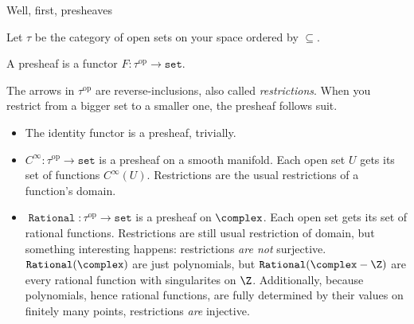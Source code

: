 \documentclass[a5paper]{scrartcl}
\def\setcat{\texttt{set}}
\newcommand{\op}{\textrm{op}}
\newcommand{\marginnote}[1]{\normalmarginpar\marginpar{\tiny\sffamily\raggedright #1}}
\DeclareMathOperator{\rat}{\texttt{Rational}}
\begin{document}
Well, first, presheaves
\begin{defn}\marginnote{\ie, draw one arrow \(A\to B\) iff \(A\subseteq B\).}
  Let \(\tau\) be the category of open sets on your space ordered by \(\subseteq\).
\end{defn}
\begin{defn}[Presheaves]
  A presheaf is a functor \(F: \tau^\op\to \setcat\).
\end{defn}
The arrows in \(\tau^\op\) are reverse-inclusions, also called \emph{restrictions}. When you restrict from a bigger set to a smaller one, the presheaf follows suit.
\begin{itemize}
  \item The identity functor is a presheaf, trivially.
  \item \(C^\infty:\tau^\op \to \setcat\) is a presheaf on a smooth manifold. Each open set \(U\) gets its set of functions \(C^\infty(U)\). Restrictions are the usual restrictions of a function's domain.

  \item \(\rat: \tau^\op \to \setcat\) is a presheaf on \(\complex\). Each open set gets its set of rational functions. Restrictions are still usual restriction of domain, but something interesting happens: restrictions \emph{are not} surjective. \(\rat(\complex)\) are just polynomials, but \(\rat(\complex - \Z)\) are every rational function with singularites on \(\Z\). Additionally, because polynomials, hence rational functions, are fully determined by their values on finitely many points, restrictions \emph{are} injective.
\end{itemize}
\end{document}
